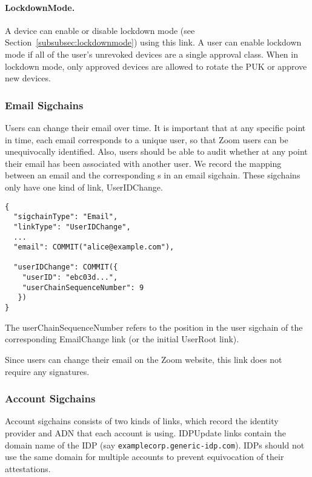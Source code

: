 \paragraph{LockdownMode.} A device can enable or disable lockdown mode (see
Section~\ref{subsubsec:lockdownmode}) using this link. A user can enable lockdown mode if all of the
user's unrevoked devices are a single approval class. When in lockdown mode, only approved devices
are allowed to rotate the PUK or approve new devices.


\subsubsection{Email Sigchains}

Users can change their email over time. It is important that at any specific point in time, each
email corresponds to a unique user, so that Zoom users can be unequivocally identified. Also, users
should be able to audit whether at any point their email has been associated with another user. We
record the mapping between an email and the corresponding {\userID}s in an email sigchain. These
sigchains only have one kind of link, \textsf{UserIDChange}.

\begin{Verbatim}
{
  "sigchainType": "Email",
  "linkType": "UserIDChange",
  ...
  "email": COMMIT("alice@example.com"),

  "userIDChange": COMMIT({
    "userID": "ebc03d...",
    "userChainSequenceNumber": 9
   })
}
\end{Verbatim}

The \textsf{userChainSequenceNumber} refers to the position in the user sigchain of the
corresponding \textsf{EmailChange} link (or the initial \textsf{UserRoot} link).

Since users can change their email on the Zoom website, this link does not require any signatures.

\subsubsection{Account Sigchains}

Account sigchains consists of two kinds of links, which record the identity provider and ADN that
each account is using. \textsf{IDPUpdate} links contain the domain name of the IDP (say
\texttt{examplecorp.generic-idp.com}). IDPs should not use the same domain for multiple accounts
to prevent equivocation of their attestations.

